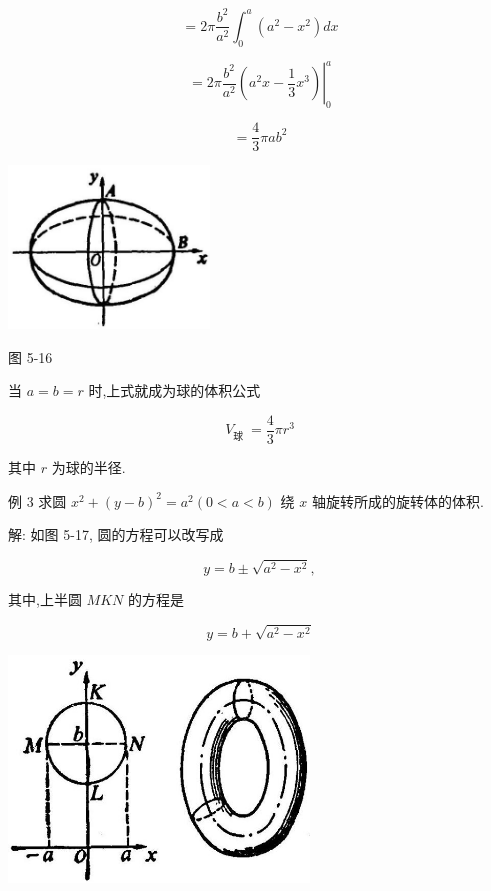 \documentclass[lang=cn,newtx,12pt,scheme=chinese]{elegantbook}
\begin{document}
\[
= {2\pi }\frac{{b}^{2}}{{a}^{2}}{\int }_{0}^{a}\left( {{a}^{2} - {x}^{2}}\right) {dx}
\]

\[
= {\left. 2\pi \frac{{b}^{2}}{{a}^{2}}\left( {a}^{2}x - \frac{1}{3}{x}^{3}\right) \right| }_{0}^{a}
\]

\[
= \frac{4}{3}{\pi a}{b}^{2}
\]

\begin{center}
\includegraphics[max width=0.4\textwidth]{images/01912c18-5c3f-733d-b775-749ba9897a9d_238_905216.jpg}
\end{center}

图 5-16

当 \(a = b = r\) 时,上式就成为球的体积公式

\[
{V}_{\text{球 }} = \frac{4}{3}\pi {r}^{3}
\]

其中 \(r\) 为球的半径.

例 3 求圆 \({x}^{2} + {\left( y - b\right) }^{2} = {a}^{2}\left( {0 < a < b}\right)\) 绕 \(x\) 轴旋转所成的旋转体的体积.

解: 如图 5-17, 圆的方程可以改写成

\[
y = b \pm \sqrt{{a}^{2} - {x}^{2}},
\]

其中,上半圆 \({MKN}\) 的方程是

\[
y = b + \sqrt{{a}^{2} - {x}^{2}}
\]

\begin{center}
\includegraphics[max width=0.6\textwidth]{images/01912c18-5c3f-733d-b775-749ba9897a9d_239_464014.jpg}
\end{center}
\end{document}
